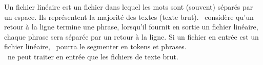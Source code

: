 \documentclass[manual-fr.tex]{subfiles}
\begin{document}
Un fichier linéaire est un fichier dans lequel les mots sont (souvent) séparés par un espace. Ils représentent la majorité des textes (texte brut). \SEM\ considère qu'un retour à la ligne termine une phrase, lorsqu'il fournit en sortie un fichier linéaire, chaque phrase sera séparée par un retour à la ligne. Si un fichier en entrée est un fichier linéaire, \SEM\ pourra le segmenter en tokens et phrases.\\

\SEM\ ne peut traiter en entrée que les fichiers de texte brut.
\end{document}
